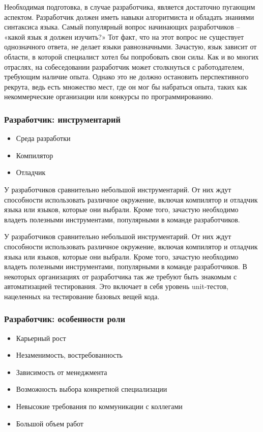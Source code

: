 \documentclass{../industrial-development}
\begin{document}
\lecturenotes

Необходимая подготовка, в случае разработчика, является достаточно пугающим аспектом. Разработчик должен иметь навыки алгоритмиста и обладать знаниями синтаксиса языка. Самый популярный вопрос начинающих разработчиков – «какой язык я должен изучить?» Тот факт, что на этот вопрос не существует однозначного ответа, не делает языки равнозначными. Зачастую, язык зависит от области, в которой специалист хотел бы попробовать свои силы. 
Как и во многих отраслях, на собеседовании разработчик может столкнуться с работодателем, требующим наличие опыта. Однако это не должно остановить перспективного рекрута, ведь есть множество мест, где он мог бы набраться опыта, таких как некоммерческие организации или конкурсы по программированию. 
 ~\cite{Anatomy}

\begin{frame} \frametitle{Разработчик: инструментарий}
  \begin{itemize}
  \item Среда разработки
  \item Компилятор
  \item Отладчик
  \end{itemize}
  \begin{block}{}
	\alert{} У разработчиков сравнительно небольшой инструментарий. От них ждут способности использовать различное окружение, включая компилятор и отладчик языка или языков, которые они выбрали. Кроме того, зачастую необходимо владеть полезными инструментами, популярными в команде разработчиков.
\end{block}
\end{frame}

\lecturenotes

У разработчиков сравнительно небольшой инструментарий. От них ждут способности использовать различное окружение, включая компилятор и отладчик языка или языков, которые они выбрали. Кроме того, зачастую необходимо владеть полезными инструментами, популярными в команде разработчиков. 
В некоторых организациях от разработчика так же требуют быть знакомым с автоматизацией тестирования. Это включает в себя уровень unit-тестов, нацеленных на тестирование базовых вещей кода. 
  ~\cite{Anatomy}

\begin{frame} \frametitle{Разработчик: особенности роли}
  \begin{itemize}
  \item Карьерный рост
  \item Незаменимость, востребованность 
  \item Зависимость от менеджмента
  \item Возможность выбора конкретной специализации
  \item Невысокие требования по коммуникации с коллегами
  \item Большой объем работ
  \end{itemize}
\end{frame}
\end{document}
